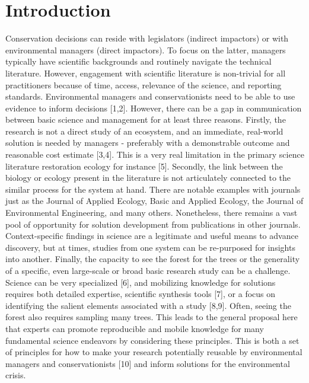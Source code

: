\documentclass[10pt,letterpaper]{article}
\begin{document}
\linenumbers

\section{Introduction}\label{introduction}

Conservation decisions can reside with legislators (indirect impactors)
or with environmental managers (direct impactors). To focus on the
latter, managers typically have scientific backgrounds and routinely
navigate the technical literature. However, engagement with scientific
literature is non-trivial for all practitioners because of time, access,
relevance of the science, and reporting standards. Environmental
managers and conservationists need to be able to use evidence to inform
decisions {[}1,2{]}. However, there can be a gap in communication
between basic science and management for at least three reasons.
Firstly, the research is not a direct study of an ecosystem, and an
immediate, real-world solution is needed by managers - preferably with a
demonstrable outcome and reasonable cost estimate {[}3,4{]}. This is a
very real limitation in the primary science literature restoration
ecology for instance {[}5{]}. Secondly, the link between the biology or
ecology present in the literature is not articulately connected to the
similar process for the system at hand. There are notable examples with
journals just as the Journal of Applied Ecology, Basic and Applied
Ecology, the Journal of Environmental Engineering, and many others.
Nonetheless, there remains a vast pool of opportunity for solution
development from publications in other journals. Context-specific
findings in science are a legitimate and useful means to advance
discovery, but at times, studies from one system can be re-purposed for
insights into another. Finally, the capacity to see the forest for the
trees or the generality of a specific, even large-scale or broad basic
research study can be a challenge. Science can be very specialized
{[}6{]}, and mobilizing knowledge for solutions requires both detailed
expertise, scientific synthesis tools {[}7{]}, or a focus on identifying
the salient elements associated with a study {[}8,9{]}. Often, seeing
the forest also requires sampling many trees. This leads to the general
proposal here that experts can promote reproducible and mobile knowledge
for many fundamental science endeavors by considering these principles.
This is both a set of principles for how to make your research
potentially reusable by environmental managers and conservationists
{[}10{]} and inform solutions for the environmental crisis.
\end{document}
